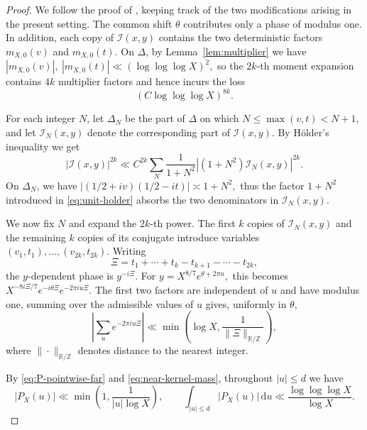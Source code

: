 \documentclass[a4paper,12pt,reqno]{amsart}
\numberwithin{equation}{section}
\theoremstyle{remark}
\newcommand{\R}{\mathbb{R}}
\newcommand{\Z}{\mathbb{Z}}
\begin{document}
\begin{proof}
We follow the proof of
\cite[Proposition~3 and Section~3.4]{Harper2023Large}, keeping track of
the two modifications arising in the present setting.  The common shift
$\theta$ contributes only a phase of modulus one.  In addition, each copy
of ${\mathcal I}(x,y)$ contains the two deterministic factors
$m_{X,0}(v)$ and $m_{X,0}(t)$.  On $\Delta$, by Lemma~\ref{lem:multiplier} we have
\(
 |m_{X,0}(v)|,\ |m_{X,0}(t)|
 \ll(\log\log\log X)^2,
\)
so the $2k$-th moment expansion contains $4k$ multiplier factors and
hence incurs the loss
\begin{equation}\label{eq:multiplier-2k-loss}
 (C\log\log\log X)^{8k}.
\end{equation}

For each integer $N$, let $\Delta_N$ be the part of $\Delta$ on which \( N\leq\max(v,t)<N+1,
\)
and let ${\mathcal I}_N(x,y)$ denote the corresponding part of
${\mathcal I}(x,y)$.  By H\"older's inequality we get
\begin{equation}\label{eq:unit-holder}
 |{\mathcal I}(x,y)|^{2k}
 \ll C^{2k}\sum_N\frac1{1+N^2}
 \left|(1+N^2){\mathcal I}_N(x,y)\right|^{2k}.
\end{equation}
On $\Delta_N$, we have \( |(1/2+iv)(1/2-it)| \asymp 1+N^2,\) thus the factor $1+N^2$ introduced in \eqref{eq:unit-holder} absorbs
the two denominators in ${\mathcal I}_N(x,y)$.


We now fix $N$ and expand the $2k$-th power. The first $k$ copies of
${\mathcal I}_N(x,y)$ and the remaining $k$ copies of its conjugate
introduce variables
\(
 (v_1,t_1),\ldots,(v_{2k},t_{2k}).
\) 
Writing
\[
 \Xi=t_1+\cdots+t_k-t_{k+1}-\cdots-t_{2k},
\]
the $y$-dependent phase is $y^{-i\Xi}$.  For
\(
 y=X^{8/7}e^{\theta+2\pi u},
\)
this becomes \( X^{-8i\Xi/7}e^{-i\theta\Xi}e^{-2\pi iu\Xi}.
\)
The first two factors are independent of $u$ and have modulus one,  summing over the admissible values of $u$ gives, uniformly
in $\theta$, 
\begin{equation}\label{eq:y-geometric-sum}
 \left|\sum_u e^{-2\pi iu\Xi}\right|
 \ll
 \min\left(\log X,\frac1{\|\Xi\|_{\R/\Z}}\right),
\end{equation}
where $\|\cdot\|_{\R/\Z}$ denotes distance to the nearest integer.

By \eqref{eq:P-pointwise-far} and \eqref{eq:near-kernel-mass}, throughout
$|u|\leq d$ we have
\begin{equation}\label{eq:PX-L1-high-moment}
 |P_X(u)|
 \ll\min\left(1,\frac1{|u|\log X}\right),
 \qquad
 \int_{|u|\leq d}|P_X(u)|\,\mathrm{d}u
 \ll\frac{\log\log\log X}{\log X}.
\end{equation}


\end{proof}
\end{document}
